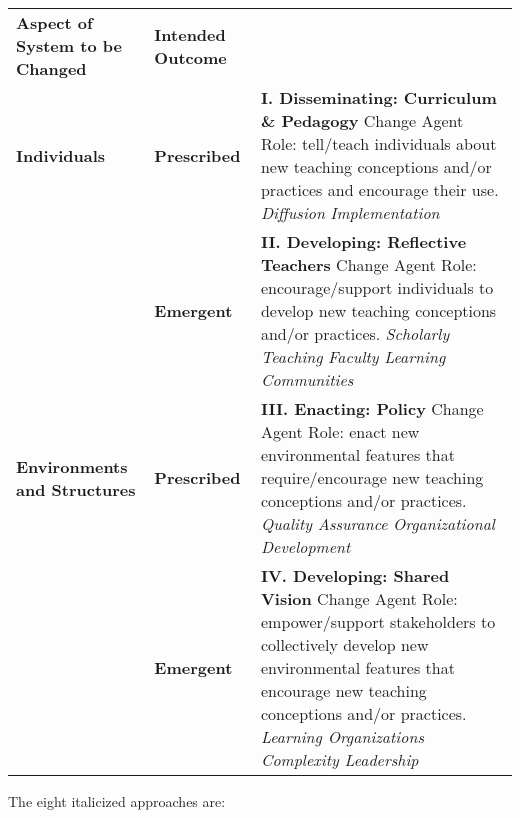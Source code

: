 \begin{tabular}{lll}

\textbf{Aspect of System to be Changed}
&
\textbf{Intended Outcome}
&
\\

\textbf{Individuals}
&
\textbf{Prescribed}
&
  \textbf{I. Disseminating: Curriculum \& Pedagogy}
  \newline
  Change Agent Role: tell/teach individuals about new teaching conceptions and/or practices and encourage their use.
  \newline
  \emph{Diffusion}
  \newline
  \emph{Implementation}
\\

&
\textbf{Emergent}
&
  \textbf{II. Developing: Reflective Teachers}
  \newline
  Change Agent Role: encourage/support individuals to develop new teaching conceptions and/or practices.
  \newline
  \emph{Scholarly Teaching}
  \newline
  \emph{Faculty Learning Communities}
\\

\textbf{Environments and Structures}
&
\textbf{Prescribed}
&
  \textbf{III. Enacting: Policy}
  \newline
  Change Agent Role: enact new environmental features that require/encourage new teaching conceptions and/or practices.
  \newline
  \emph{Quality Assurance}
  \newline
  \emph{Organizational Development}
\\

&
\textbf{Emergent}
&
  \textbf{IV. Developing: Shared Vision}
  \newline
  Change Agent Role: empower/support stakeholders to collectively develop new environmental features that encourage new teaching conceptions and/or practices.
  \newline
  \emph{Learning Organizations}
  \newline
  \emph{Complexity Leadership}
\\
\end{tabular}

The eight italicized approaches are:

